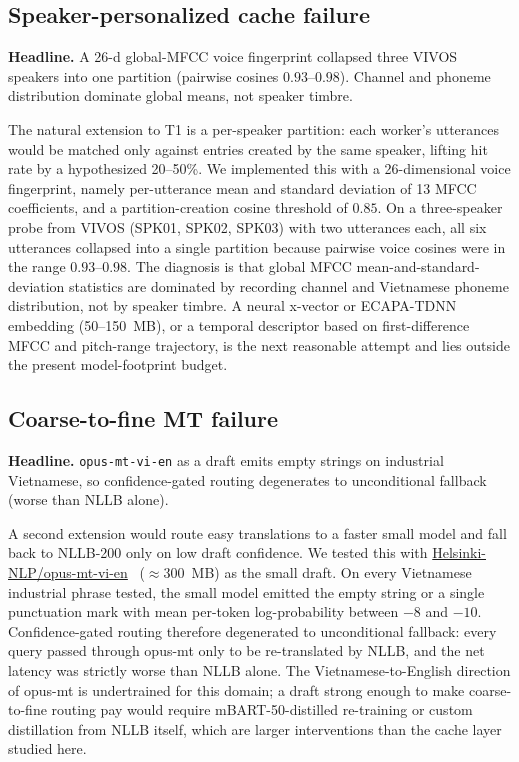 \documentclass[a4paper,fleqn]{cas-dc}
\begin{document}
\subsection{Speaker-personalized cache failure}\label{sec:lim:speaker}
\textbf{Headline.} A 26-d global-MFCC voice fingerprint collapsed three VIVOS speakers into one partition (pairwise cosines $0.93$--$0.98$). Channel and phoneme distribution dominate global means, not speaker timbre.

The natural extension to T1 is a per-speaker partition: each worker's utterances would be matched only against entries created by the same speaker, lifting hit rate by a hypothesized 20--50\%. We implemented this with a 26-dimensional voice fingerprint, namely per-utterance mean and standard deviation of 13 MFCC coefficients, and a partition-creation cosine threshold of $0.85$. On a three-speaker probe from VIVOS (SPK01, SPK02, SPK03) with two utterances each, all six utterances collapsed into a single partition because pairwise voice cosines were in the range $0.93$--$0.98$. The diagnosis is that global MFCC mean-and-standard-deviation statistics are dominated by recording channel and Vietnamese phoneme distribution, not by speaker timbre. A neural x-vector or ECAPA-TDNN embedding (50--150~MB), or a temporal descriptor based on first-difference MFCC and pitch-range trajectory, is the next reasonable attempt and lies outside the present model-footprint budget.

\subsection{Coarse-to-fine MT failure}\label{sec:lim:c2f}
\textbf{Headline.} \texttt{opus-mt-vi-en} as a draft emits empty strings on industrial Vietnamese, so confidence-gated routing degenerates to unconditional fallback (worse than NLLB alone).

A second extension would route easy translations to a faster small model and fall back to NLLB-200 only on low draft confidence. We tested this with \url{Helsinki-NLP/opus-mt-vi-en}~\citep{tiedemann2020tatoeba} ($\approx 300$~MB) as the small draft. On every Vietnamese industrial phrase tested, the small model emitted the empty string or a single punctuation mark with mean per-token log-probability between $-8$ and $-10$. Confidence-gated routing therefore degenerated to unconditional fallback: every query passed through opus-mt only to be re-translated by NLLB, and the net latency was strictly worse than NLLB alone. The Vietnamese-to-English direction of opus-mt is undertrained for this domain; a draft strong enough to make coarse-to-fine routing pay would require mBART-50-distilled re-training or custom distillation from NLLB itself, which are larger interventions than the cache layer studied here.
\end{document}
